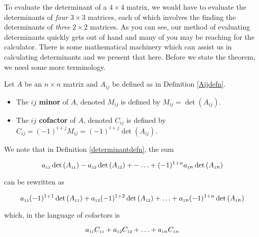 \documentclass{ximera}
\begin{document}
To evaluate the determinant of a $4 \times 4$ matrix, we would have to evaluate the determinants of \textit{four} $3 \times 3$ matrices, each of which involves the finding the determinants of \textit{three} $2 \times 2$ matrices. As you can see, our method of evaluating determinants quickly gets out of hand and many of you may be reaching for the calculator.  There is some mathematical machinery which can assist us in calculating determinants and we present that here.  Before we state the theorem, we need some more terminology.

\smallskip


\begin{definition}  \label{minorcofactordefn} Let $A$ be an $n \times n$ matrix and $A_{ij}$ be defined as in Definition \ref{Aijdefn}.  

\begin{itemize}

\item The   \textbf{\boldmath $ij$ minor} of $A$, denoted $M_{ij}$ is defined by $M_{ij} = \det\left(A_{ij}\right)$. 

\item The \textbf{\boldmath $ij$ cofactor} of $A$, denoted $C_{ij}$ is defined by $C_{ij} = (-1)^{i+j}M_{ij} = (-1)^{i+j}\det\left(A_{ij}\right)$. 

\end{itemize}

\end{definition}


\smallskip

We note that in Definition \ref{determinantdefn}, the sum 

\[a_{\mbox{\tiny$11$}} \det\left(A_{\mbox{\tiny$11$}}\right)- a_{\mbox{\tiny$12$}} \det\left(A_{\mbox{\tiny$12$}}\right) + -  \ldots  + (-1)^{1+n} a_{\mbox{\tiny$1$}n} \det\left(A_{\mbox{\tiny$1$}n}\right)\]

can be rewritten as

\[a_{\mbox{\tiny$11$}} (-1)^{1+1} \det\left(A_{\mbox{\tiny$11$}}\right) + a_{\mbox{\tiny$12$}} (-1)^{1+2} \det\left(A_{\mbox{\tiny$12$}}\right) + \ldots  + a_{\mbox{\tiny$1$}n} (-1)^{1+n} \det\left(A_{\mbox{\tiny$1$}n}\right)\]

which, in the language of cofactors is

\[a_{\mbox{\tiny$11$}} C_{\mbox{\tiny$11$}} + a_{\mbox{\tiny$12$}}C_{\mbox{\tiny$12$}} + \ldots  + a_{\mbox{\tiny$1$}n}C_{\mbox{\tiny$1$}n} \]
\end{document}
